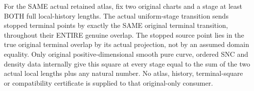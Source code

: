 \begin{theorem}
\label{hir:sharp-actual-curve-stopped-atlas-transition-square}
\leanok
For the SAME actual retained atlas, fix two original charts and a stage
at least BOTH full local-history lengths. The actual uniform-stage
transition sends stopped terminal points by exactly the SAME original
terminal transition, throughout their ENTIRE genuine overlap. The
stopped source point lies in the true original terminal overlap by its
actual projection, not by an assumed domain equality. Only original
positive-dimensional smooth pure curve, ordered SNC and density data
internally give this square at every stage equal to the sum of the two
actual local lengths plus any natural number. No atlas, history,
terminal-square or compatibility certificate is supplied to that
original-only consumer.
\end{theorem}
